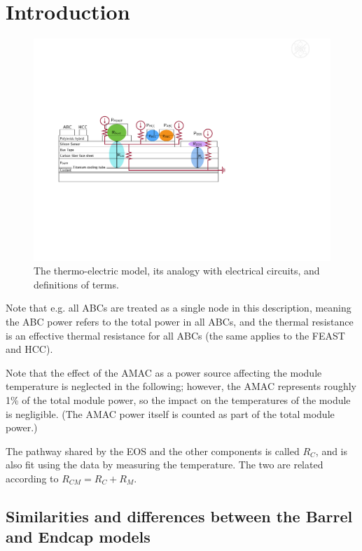 
\section{Introduction}


\begin{figure}[ht!]
\includegraphics[width=.99\textwidth]{figures/thermoelectric_model.pdf}
\caption{
The thermo-electric model, its analogy with electrical circuits, and definitions of terms.
}
\label{thermoelectric_model}
\end{figure}

Note that e.g. all ABCs are treated as a single node in this description, meaning the ABC power refers
to the total power in all ABCs, and the thermal resistance is an effective thermal resistance for all
ABCs (the same applies to the FEAST and HCC).

Note that the effect of the AMAC as a power source affecting the module temperature is neglected in
the following; however, the AMAC represents roughly 1\% of the total module power, so the impact on
the temperatures of the module is negligible. (The AMAC power itself is counted as part of the total
module power.)

The pathway shared by the EOS and the other components is called $R_{C}$, and is also fit using the
data by measuring the temperature. The two are related according to $R_{CM} = R_C + R_M$.

\subsection{Similarities and differences between the Barrel and Endcap models}

